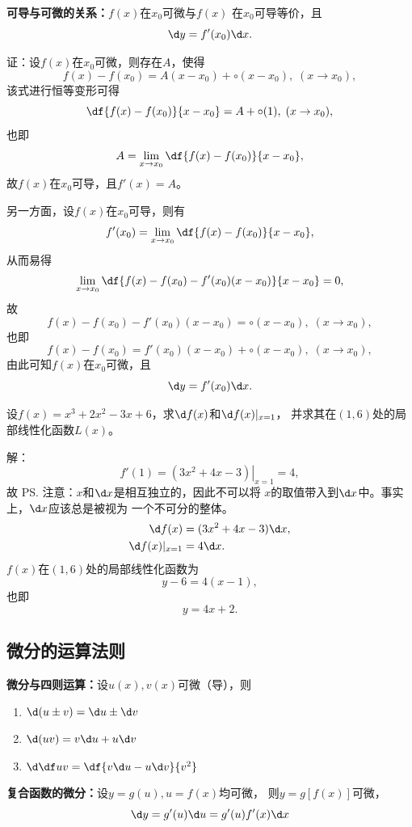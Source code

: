 \begin{thx}
	{\bf 可导与可微的关系：}$f(x)$在$x_0$可微与$f(x)$
	在$x_0$可导等价，且
	$$\d y =f'(x_0)\d x.$$
\end{thx}

证：设$f(x)$在$x_0$可微，则存在$A$，使得
$$f(x)-f(x_0)=A(x-x_0)+\circ(x-x_0),\;(x\to x_0),$$
该式进行恒等变形可得
$$\df{f(x)-f(x_0)}{x-x_0}=A+\circ(1),\;(x\to x_0),$$
也即
$$A=\lim\limits_{x\to x_0}\df{f(x)-f(x_0)}{x-x_0},$$
故$f(x)$在$x_0$可导，且$f'(x)=A$。

另一方面，设$f(x)$在$x_0$可导，则有
$$f'(x_0)=\lim\limits_{x\to x_0}\df{f(x)-f(x_0)}{x-x_0},$$
从而易得
$$\lim\limits_{x\to x_0}\df{f(x)-f(x_0)
-f'(x_0)(x-x_0)}{x-x_0}=0,$$
故
$$f(x)-f(x_0)-f'(x_0)(x-x_0)=\circ(x-x_0),\;(x\to x_0),$$
也即
$$f(x)-f(x_0)=f'(x_0)(x-x_0)+\circ(x-x_0),\;(x\to x_0),$$
由此可知$f(x)$在$x_0$可微，且
$$\d y =f'(x_0)\d x.$$
\fin

\bs
\egz 设$f(x)=x^3+2x^2-3x+6$，求$\d f(x)$和$\d f(x)|_{x=1}$，
并求其在$(1,6)$处的局部线性化函数$L(x)$。

解：
$$f'(1)=\left.(3x^2+4x-3)\right|_{x=1}=4,$$
故
\ps{\baa 注意：$x$和$\d x$是相互独立的，因此不可以将
$x$的取值带入到$\d x$中。事实上，$\d x$应该总是被视为
一个不可分的整体。}
\begin{align*}
	\d f(x)& =(3x^2+4x-3)\d x,\\
	\d f(x)|_{x=1}&=4\d x.
\end{align*}
$f(x)$在$(1,6)$处的局部线性化函数为
$$y-6=4(x-1),$$
也即
$$y=4x+2.$$
\fin

\subsection{微分的运算法则}

\begin{thx}
	{\bf 微分与四则运算：}设$u(x),v(x)$可微（导），则
	\begin{enumerate}[(1)]
	  \item $\d (u\pm v)=\d u\pm \d v$
	  \item $\d(uv)=v\d u+u\d v$
	  \item $\d\df uv=\df{v\d u-u\d v}{v^2}$
	\end{enumerate}
	
	\bs
	{\bf 复合函数的微分：}设$y=g(u),u=f(x)$均可微，
	则$y=g[f(x)]$可微，
	$$\d y=g'(u)\d u=g'(u)f'(x)\d x$$		
\end{thx}

